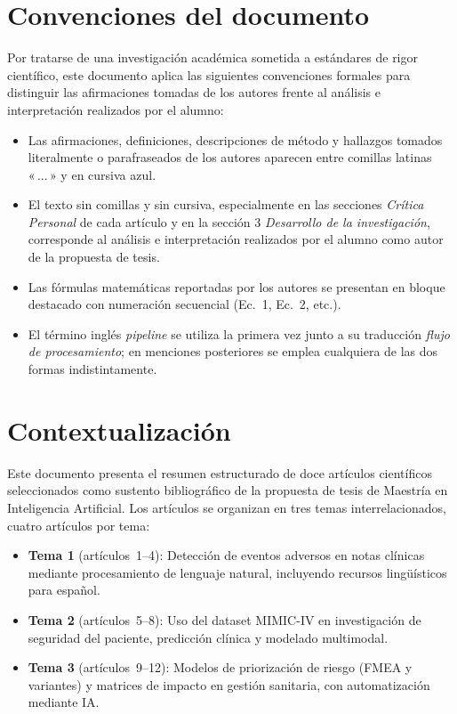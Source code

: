 \documentclass[11pt,a4paper]{article}
\begin{document}
\section*{Convenciones del documento}

Por tratarse de una investigación académica sometida a estándares de rigor científico, este documento aplica las siguientes convenciones formales para distinguir las afirmaciones tomadas de los autores frente al análisis e interpretación realizados por el alumno:

\begin{itemize}
  \item Las afirmaciones, definiciones, descripciones de método y hallazgos tomados literalmente o parafraseados de los autores aparecen entre comillas latinas «\,...\,» y en cursiva azul.
  \item El texto sin comillas y sin cursiva, especialmente en las secciones \textit{Crítica Personal} de cada artículo y en la sección 3 \textit{Desarrollo de la investigación}, corresponde al análisis e interpretación realizados por el alumno como autor de la propuesta de tesis.
  \item Las fórmulas matemáticas reportadas por los autores se presentan en bloque destacado con numeración secuencial (Ec.~1, Ec.~2, etc.).
  \item El término inglés \textit{pipeline} se utiliza la primera vez junto a su traducción \textit{flujo de procesamiento}; en menciones posteriores se emplea cualquiera de las dos formas indistintamente.
\end{itemize}

\newpage

\section*{Contextualización}

Este documento presenta el resumen estructurado de doce artículos científicos seleccionados como sustento bibliográfico de la propuesta de tesis de Maestría en Inteligencia Artificial. Los artículos se organizan en tres temas interrelacionados, cuatro artículos por tema:
\begin{itemize}
  \item \textbf{Tema 1} (artículos~1--4): Detección de eventos adversos en notas clínicas mediante procesamiento de lenguaje natural, incluyendo recursos lingüísticos para español.
  \item \textbf{Tema 2} (artículos~5--8): Uso del dataset MIMIC-IV en investigación de seguridad del paciente, predicción clínica y modelado multimodal.
  \item \textbf{Tema 3} (artículos~9--12): Modelos de priorización de riesgo (FMEA y variantes) y matrices de impacto en gestión sanitaria, con automatización mediante IA.
\end{itemize}
\end{document}
